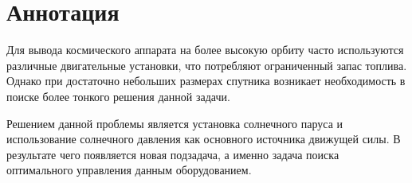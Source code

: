 \chapter*{Аннотация}
\noindent\indent Для вывода космического аппарата на более высокую орбиту
часто используются различные двигательные установки, что потребляют ограниченный
запас топлива. Однако при достаточно небольших размерах спутника возникает необходимость
в поиске более тонкого решения данной задачи.\par
Решением данной проблемы является установка солнечного паруса и использование
солнечного давления как основного источника движущей силы. В результате чего
появляется новая подзадача, а именно задача поиска оптимального управления данным
оборудованием.
